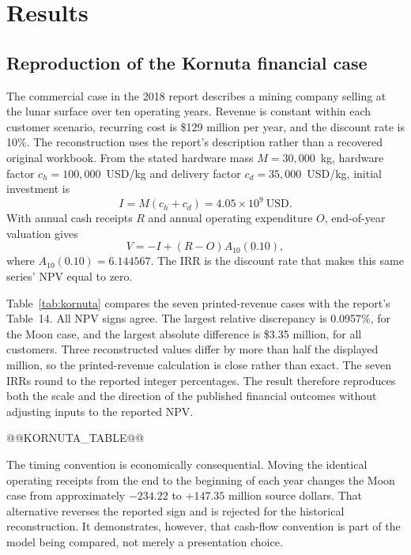 \documentclass[final,5p,times,twocolumn]{elsarticle}
\begin{document}
\section{Results}
\subsection{Reproduction of the Kornuta financial case}
The commercial case in the 2018 report describes a mining company selling at the lunar surface over ten operating years. Revenue is constant within each customer scenario, recurring cost is \$129 million per year, and the discount rate is 10\%. The reconstruction uses the report's description rather than a recovered original workbook. From the stated hardware mass $M=30{,}000$~kg, hardware factor $c_h=100{,}000$~USD/kg and delivery factor $c_d=35{,}000$~USD/kg, initial investment is
\begin{equation}
I=M(c_h+c_d)=4.05\times10^9\ \mathrm{USD}.
\end{equation}
With annual cash receipts $R$ and annual operating expenditure $O$, end-of-year valuation gives
\begin{equation}
V=-I+(R-O)A_{10}(0.10),
\label{eq:kornuta}
\end{equation}
where $A_{10}(0.10)=6.144567$. The IRR is the discount rate that makes this same series' NPV equal to zero.

Table~\ref{tab:kornuta} compares the seven printed-revenue cases with the report's Table~14. All NPV signs agree. The largest relative discrepancy is 0.0957\%, for the Moon case, and the largest absolute difference is \$3.35 million, for all customers. Three reconstructed values differ by more than half the displayed million, so the printed-revenue calculation is close rather than exact. The seven IRRs round to the reported integer percentages. The result therefore reproduces both the scale and the direction of the published financial outcomes without adjusting inputs to the reported NPV.

@@KORNUTA_TABLE@@

The timing convention is economically consequential. Moving the identical operating receipts from the end to the beginning of each year changes the Moon case from approximately $-234.22$ to $+147.35$ million source dollars. That alternative reverses the reported sign and is rejected for the historical reconstruction. It demonstrates, however, that cash-flow convention is part of the model being compared, not merely a presentation choice.
\end{document}
